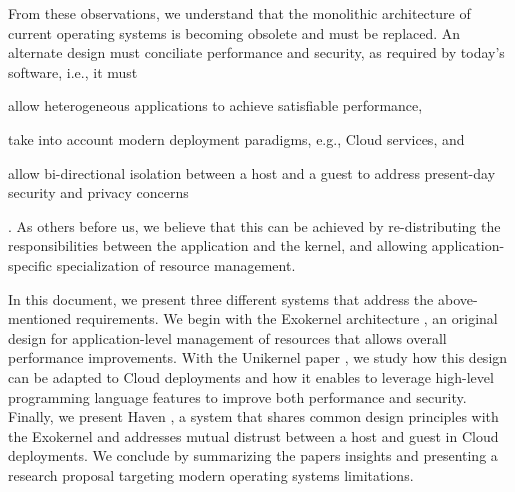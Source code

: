 From these observations, we understand that the monolithic architecture of current operating systems is becoming obsolete and must be replaced.
An alternate design must conciliate performance and security, as required by today's software, i.e., it must
\begin{enumerate*}
	\item allow heterogeneous applications to achieve satisfiable performance,
	\item take into account modern deployment paradigms, e.g., Cloud services, and 
	\item allow bi-directional isolation between a host and a guest to address present-day security and privacy concerns
\end{enumerate*}.
As others before us\cite{DBLP:conf/sosp/EnglerKO95,DBLP:conf/hotos/EnglerK95,DBLP:conf/sosp/KaashoekEGBHMPGM97,DBLP:journals/tocs/CaoFKL96,DBLP:journals/sigops/HartyC92}, we believe that this can be achieved by re-distributing the responsibilities between the application and the kernel, and allowing application-specific specialization of resource management.

In this document, we present three different systems that address the above-mentioned requirements.
We begin with the Exokernel architecture \cite{DBLP:conf/sosp/EnglerKO95}, an original design for application-level management of resources that allows overall performance improvements.
With the Unikernel paper \cite{DBLP:conf/asplos/MadhavapeddyMRSSGSHC13}, we study how this design can be adapted to Cloud deployments and how it enables to leverage high-level programming language features to improve both performance and security.
Finally, we present Haven \cite{DBLP:journals/tocs/BaumannPH15}, a system that shares common design principles with the Exokernel and addresses mutual distrust between a host and guest in Cloud deployments.
We conclude by summarizing the papers insights and presenting a research proposal targeting modern operating systems limitations.







